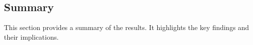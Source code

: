 \subsection{Summary}

This section provides a summary of the results. It highlights the key findings and their implications.